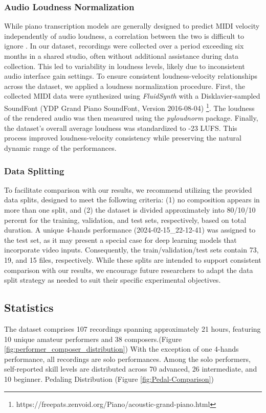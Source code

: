 \documentclass{article}
\begin{document}
\subsubsection{Audio Loudness Normalization}
While piano transcription models are generally designed to predict MIDI velocity independently of audio loudness, a correlation between the two is difficult to ignore \cite{}. In our dataset, recordings were collected over a period exceeding six months in a shared studio, often without additional assistance during data collection. This led to variability in loudness levels, likely due to inconsistent audio interface gain settings. To ensure consistent loudness-velocity relationships across the dataset, we applied a loudness normalization procedure. First, the collected MIDI data were synthesized using \textit{FluidSynth} with a Disklavier-sampled SoundFont (YDP Grand Piano SoundFont, Version 2016-08-04) \footnote{https://freepats.zenvoid.org/Piano/acoustic-grand-piano.html}. The loudness of the rendered audio was then measured using the \textit{pyloudnorm} package. Finally, the dataset's overall average loudness was standardized to -23 LUFS. This process improved loudness-velocity consistency while preserving the natural dynamic range of the performances.

\subsubsection{Data Splitting}
To facilitate comparison with our results, we recommend utilizing the provided data splits, designed to meet the following criteria: (1) no composition appears in more than one split, and (2) the dataset is divided approximately into 80/10/10 percent for the training, validation, and test sets, respectively, based on total duration. A unique 4-hands performance (2024-02-15\_22-12-41) was assigned to the test set, as it may present a special case for deep learning models that incorporate video inputs. Consequently, the train/validation/test sets contain 73, 19, and 15 files, respectively. While these splits are intended to support consistent comparison with our results, we encourage future researchers to adapt the data split strategy as needed to suit their specific experimental objectives.

\subsection{Statistics}
The dataset comprises 107 recordings spanning approximately 21 hours, featuring 10 unique amateur performers and 38 composers.(Figure \ref{fig:performer_composer_distribution})  With the exception of one 4-hands performance, all recordings are solo performances. Among the solo performers, self-reported skill levels are distributed across 70 advanced, 26 intermediate, and 10 beginner. Pedaling Distribution (Figure \ref{fig:Pedal-Comparison})
\end{document}
